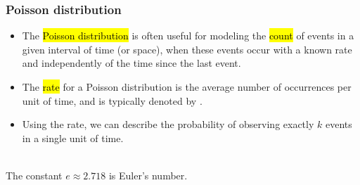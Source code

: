 \documentclass[slidestop,compress,mathserif]{beamer}
\begin{document}
\begin{frame}
\frametitle{Poisson distribution}

\begin{itemize}

\item The \hl{Poisson distribution} is often useful for modeling the \hl{count} of events in a given interval of time (or space), when these events occur with a known rate and independently of the time since the last event.

\item The \hl{rate} for a Poisson distribution is the average number of occurrences per unit of time, and is typically denoted by \mathhl{\lambda}.

\item Using the rate, we can describe the probability of observing exactly $k$ events in a single unit of time.

\end{itemize}

\vfill

{
\\
The constant $e \approx 2.718$ is Euler's number. \\

}

\end{frame}
\end{document}
